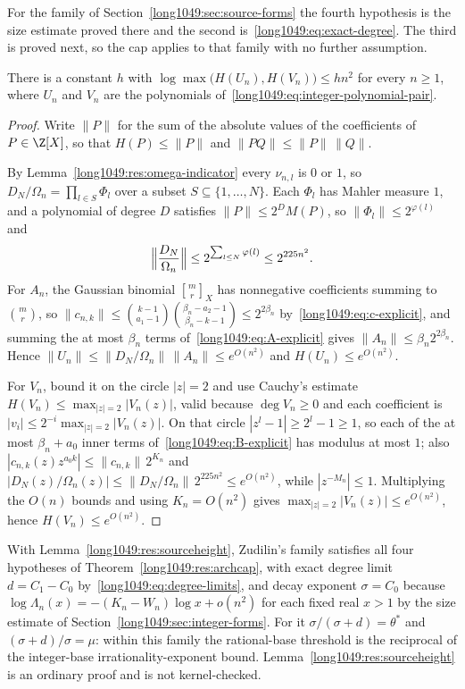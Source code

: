For the family of Section~\ref{long1049:sec:source-forms} the fourth hypothesis is the
size estimate proved there and the second is~\eqref{long1049:eq:exact-degree}.  The third
is proved next, so the cap applies to that family with no further assumption.

\begin{lemma}\label{long1049:res:sourceheight}
There is a constant $h$ with
$\log\max\bigl(H(U_n),H(V_n)\bigr)\le hn^{2}$ for every $n\ge1$, where $U_n$ and
$V_n$ are the polynomials of~\eqref{long1049:eq:integer-polynomial-pair}.
\end{lemma}

\begin{proof}
Write $\|P\|$ for the sum of the absolute values of the coefficients of
$P\in\Z[X]$, so that $H(P)\le\|P\|$ and $\|PQ\|\le\|P\|\,\|Q\|$.

By Lemma~\ref{long1049:res:omega-indicator} every $\nu_{n,l}$ is $0$ or $1$, so
$D_N/\Omega_n=\prod_{l\in S}\Phi_l$ over a subset $S\subseteq\{1,\dots,N\}$.
Each $\Phi_l$ has Mahler measure $1$, and a polynomial of degree $D$ satisfies
$\|P\|\le2^{D}M(P)$, so $\|\Phi_l\|\le2^{\varphi(l)}$ and
\[
 \Bigl\|\frac{D_N}{\Omega_n}\Bigr\|\le2^{\sum_{l\le N}\varphi(l)}\le2^{225n^{2}} .
\]
For $A_n$, the Gaussian binomial $\genfrac{[}{]}{0pt}{}{m}{r}_X$ has nonnegative
coefficients summing to $\binom{m}{r}$, so
$\|c_{n,k}\|\le\binom{k-1}{a_1-1}\binom{\beta_n-a_2-1}{\beta_n-k-1}\le2^{2\beta_n}$
by~\eqref{long1049:eq:c-explicit}, and summing the at most $\beta_n$ terms
of~\eqref{long1049:eq:A-explicit} gives $\|A_n\|\le\beta_n2^{2\beta_n}$.  Hence
$\|U_n\|\le\|D_N/\Omega_n\|\,\|A_n\|\le e^{O(n^{2})}$ and
$H(U_n)\le e^{O(n^{2})}$.

For $V_n$, bound it on the circle $|z|=2$ and use Cauchy's estimate
$H(V_n)\le\max_{|z|=2}|V_n(z)|$, valid because $\deg V_n\ge0$ and each
coefficient is $|v_i|\le2^{-i}\max_{|z|=2}|V_n(z)|$.  On that circle
$|z^{l}-1|\ge2^{l}-1\ge1$, so each of the at most $\beta_n+a_0$ inner terms
of~\eqref{long1049:eq:B-explicit} has modulus at most $1$; also
$|c_{n,k}(z)z^{a_0k}|\le\|c_{n,k}\|\,2^{K_n}$ and
$|D_N(z)/\Omega_n(z)|\le\|D_N/\Omega_n\|\,2^{225n^{2}}\le e^{O(n^{2})}$, while
$|z^{-M_n}|\le1$.  Multiplying the $O(n)$ bounds and using $K_n=O(n^{2})$ gives
$\max_{|z|=2}|V_n(z)|\le e^{O(n^{2})}$, hence $H(V_n)\le e^{O(n^{2})}$.
\end{proof}

\noindent With Lemma~\ref{long1049:res:sourceheight}, Zudilin's family satisfies all four
hypotheses of Theorem~\ref{long1049:res:archcap}, with exact degree limit $d=C_1-C_0$
by~\eqref{long1049:eq:degree-limits}, and decay exponent $\sigma=C_0$ because
$\log\Lambda_n(x)=-(K_n-W_n)\log x+o(n^{2})$ for each fixed real $x>1$ by the
size estimate of Section~\ref{long1049:sec:integer-forms}.  For it $\sigma/(\sigma+d)=\theta^{*}$ and
$(\sigma+d)/\sigma=\mu$: within this family the rational-base threshold is the
reciprocal of the integer-base irrationality-exponent bound.
Lemma~\ref{long1049:res:sourceheight} is an ordinary proof and is not kernel-checked.

